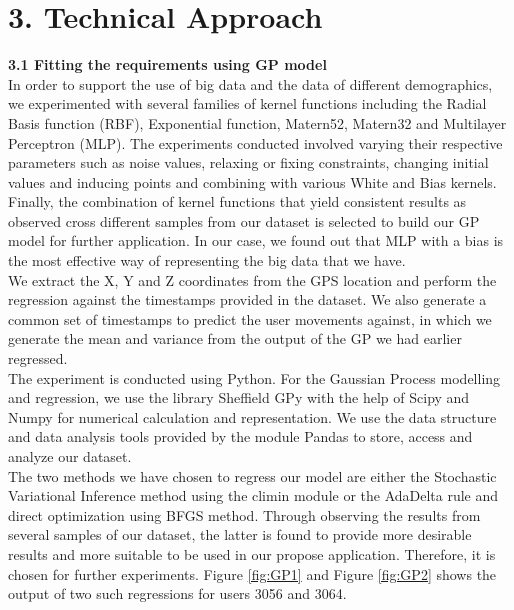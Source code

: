 \documentclass[letterpaper]{article}
\begin{document}
\section{3.  Technical Approach}

{\bf3.1  Fitting the requirements using GP model} \\

In order to support the use of big data and the data of different demographics, we experimented with several families of kernel functions including the Radial Basis function (RBF), Exponential function, Matern52, Matern32 and Multilayer Perceptron (MLP). The experiments conducted involved varying their respective parameters such as noise values, relaxing or fixing constraints, changing initial values and inducing points and combining with various White and Bias kernels. Finally, the combination of kernel functions that yield consistent results as observed cross different samples from our dataset is selected to build our GP model for further application. In our case, we found out that MLP with a bias is the most effective way of representing the big data that we have.\\

We extract the X, Y and Z coordinates from the GPS location and perform the regression against the timestamps provided in the dataset. We also generate a common set of timestamps to predict the user movements against, in which we generate the mean and variance from the output of the GP we had earlier regressed. \\

The experiment is conducted using Python. For the Gaussian Process modelling and regression, we use the library Sheffield GPy with the help of Scipy and Numpy for numerical calculation and representation. We use the data structure and data analysis tools provided by the module Pandas to store, access and analyze our dataset. \\

The two methods we have chosen to regress our model are either the Stochastic Variational Inference method using the climin module or the AdaDelta rule and direct optimization using BFGS method. Through observing the results from several samples of our dataset, the latter is found to provide more desirable results and more suitable to be used in our propose application. Therefore, it is chosen for further experiments. Figure \ref{fig:GP1} and Figure \ref{fig:GP2} shows the output of two such regressions for users 3056 and 3064. \\
\end{document}
